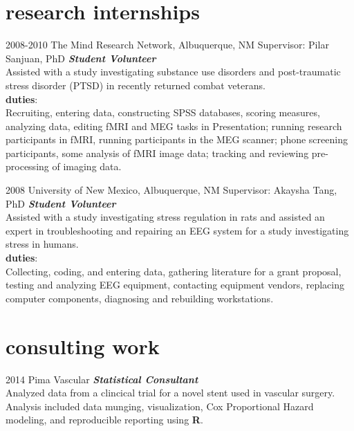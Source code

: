 \documentclass[]{friggeri-cv} %
\begin{document}
\section{research internships}
\begin{entrylist}
\entry
{2008-2010}
{The Mind Research Network, Albuquerque, NM \textemdash Supervisor: Pilar Sanjuan, PhD}
{}
{\emph{\textbf{Student Volunteer}} \\
Assisted with a study investigating substance use disorders and
post-traumatic stress disorder (PTSD) in recently returned combat veterans. \\
\textbf{duties}: \\
Recruiting, entering data, constructing SPSS databases, scoring
measures, analyzing data, editing fMRI and MEG tasks in Presentation; running research
participants in fMRI, running participants in the MEG scanner; phone screening participants,
some analysis of fMRI image data; tracking and reviewing pre-processing of imaging data.}
\end{entrylist}

\begin{entrylist}
\entry
{2008}
{University of New Mexico, Albuquerque, NM \textemdash Supervisor: Akaysha Tang, PhD}
{}
{\textbf{\emph{Student Volunteer}} \\
Assisted with a study investigating stress regulation in rats and assisted an
expert in troubleshooting and repairing an EEG system for a study investigating stress in
humans. \\
\textbf{duties}: \\
Collecting, coding, and entering data, gathering literature for a grant
proposal, testing and analyzing EEG equipment, contacting equipment vendors, replacing
computer components, diagnosing and rebuilding workstations.}
\end{entrylist}

\section{consulting work}
\begin{entrylist}
\entry
{2014}
{Pima Vascular}
{}
{\textbf{\emph{Statistical Consultant}} \\
Analyzed data from a clincical trial for a novel stent used in vascular surgery. 
Analysis included data munging, visualization, Cox Proportional Hazard modeling, 
and reproducible reporting using \textbf{R}.}
\end {entrylist}
\end{document}

